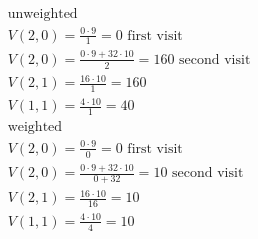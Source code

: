 \documentclass[12pt]{article}
\begin{document}
\begin{gather*}
  \text{unweighted} \\
  V(2, 0) = \frac{0 \cdot 9}{1} = 0 \text{  first visit}\\
  V(2, 0) = \frac{0 \cdot 9 + 32 \cdot 10}{2} = 160 \text{  second visit} \\
  V(2, 1) = \frac{16 \cdot 10}{1} = 160 \\
  V(1, 1) = \frac{4 \cdot 10}{1} = 40 \\
  \text{weighted} \\
  V(2, 0) = \frac{0 \cdot 9}{0} = 0 \text{  first visit}\\
  V(2, 0) = \frac{0 \cdot 9 + 32 \cdot 10}{0 + 32} = 10 \text{  second visit} \\
  V(2, 1) = \frac{16 \cdot 10}{16} = 10 \\
  V(1, 1) = \frac{4 \cdot 10}{4} = 10
\end{gather*}
\end{document}
